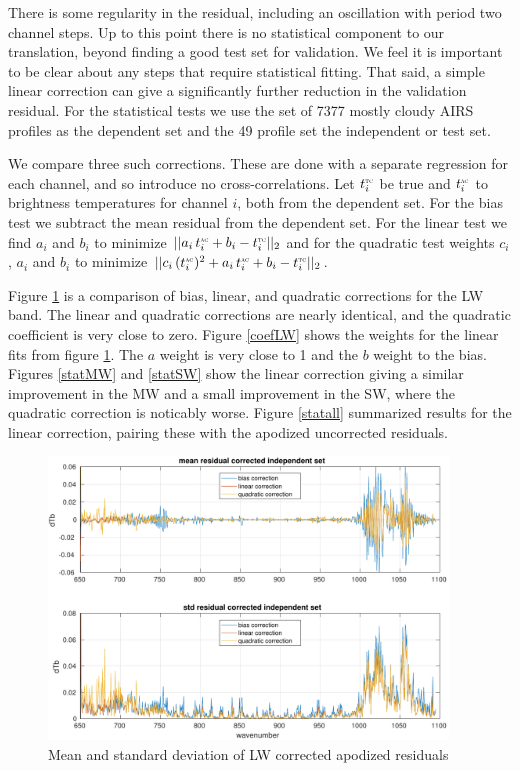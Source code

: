 \documentclass[11pt]{article}
\begin{document}
There is some regularity in the residual, including an oscillation
with period two channel steps.  Up to this point there is no
statistical component to our translation, beyond finding a good test
set for validation.  We feel it is important to be clear about any
steps that require statistical fitting.  That said, a simple linear
correction can give a significantly further reduction in the
validation residual.  For the statistical tests we use the set of
7377 mostly cloudy AIRS profiles as the dependent set and the 49
profile set the independent or test set.

We compare three such corrections.  These are done with a separate
regression for each {\cris} channel, and so introduce no
cross-correlations.  Let $t^{\mbox{\tiny\textsc{tc}}}_i$ be true {\cris} and $t^{\mbox{\tiny\textsc{ac}}}_i$
{\airs} to {\cris} brightness temperatures for {\cris} channel $i$,
both from the dependent set.  For the bias test we subtract the mean
residual from the dependent set.  For the linear test we find $a_i$
and $b_i$ to minimize $||a_i\,t^{\mbox{\tiny\textsc{ac}}}_i + b_i - t^{\mbox{\tiny\textsc{tc}}}_i||_2$ and for the
quadratic test weights $c_i$, $a_i$ and $b_i$ to minimize
$||c_i\,(t^{\mbox{\tiny\textsc{ac}}}_i)^2 + a_i\,t^{\mbox{\tiny\textsc{ac}}}_i + b_i - t^{\mbox{\tiny\textsc{tc}}}_i||_2$.

Figure \ref{statLW} is a comparison of bias, linear, and quadratic
corrections for the LW band.  The linear and quadratic corrections
are nearly identical, and the quadratic coefficient is very close 
to zero.  Figure \ref{coefLW} shows the weights for the linear fits
from figure \ref{statLW}.  The $a$ weight is very close to 1 and the
$b$ weight to the bias.  Figures \ref{statMW} and \ref{statSW} show
the linear correction giving a similar improvement in the MW and a
small improvement in the SW, where the quadratic correction is
noticably worse.  Figure \ref{statall} summarized results for the
linear correction, pairing these with the apodized uncorrected
residuals.

\begin{figure} %
  \centering
  \includegraphics[height=7.5cm]{figures/a2cris_regr_LW.pdf}
  \caption{Mean and standard deviation of LW corrected apodized
    residuals}
  \label{statLW}
\end{figure}
\end{document}
